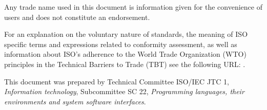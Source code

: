 Any trade name used in this document is information given for the convenience
of users and does not constitute an endorsement.

For an explanation on
the voluntary nature of standards,
the meaning of ISO specific terms and expressions related
to conformity assessment, as well as information about ISO's adherence
to the World Trade Organization (WTO) principles
in the Technical Barriers to Trade (TBT) see the following URL:
\href{http://www.iso.org/iso/foreword.html}{}.

This document was prepared by
Technical Committee ISO/IEC JTC 1, \textit{Information technology},
Subcommittee SC 22, \textit{Programming languages, their environments and system software interfaces}.
